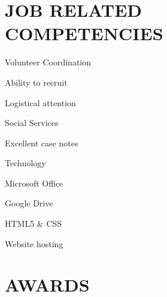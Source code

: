\documentclass[margin]{res}
\begin{document}
\begin{resume}
\section{JOB RELATED COMPETENCIES} \vspace{0pt}
	\begin{multicols}{2}
		\parskip=0pt
		\begin{skill}{Volunteer Coordination}
			\item Ability to recruit
			\item Logistical attention
		\end{skill}
		\begin{skill}{Social Services}
			\item Excellent case notes
		\end{skill}
		\begin{skill}{Technology}
			\item Microsoft Office
			\item Google Drive
			\item HTML5 \& CSS
			\item Website hosting
		\end{skill}

	\end{multicols}

\section{AWARDS} \vspace{10pt}
	\begin{description}[noitemsep,topsep=0pt]
	\end{description}
 





\end{resume}
\end{document}

